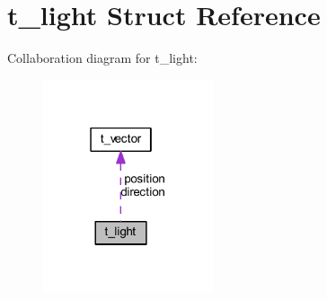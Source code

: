 \hypertarget{structt__light}{}\section{t\+\_\+light Struct Reference}
\label{structt__light}


Collaboration diagram for t\+\_\+light\+:
\nopagebreak
\begin{figure}[H]
\begin{center}
\leavevmode
\includegraphics[width=142pt]{structt__light__coll__graph}
\end{center}
\end{figure}
